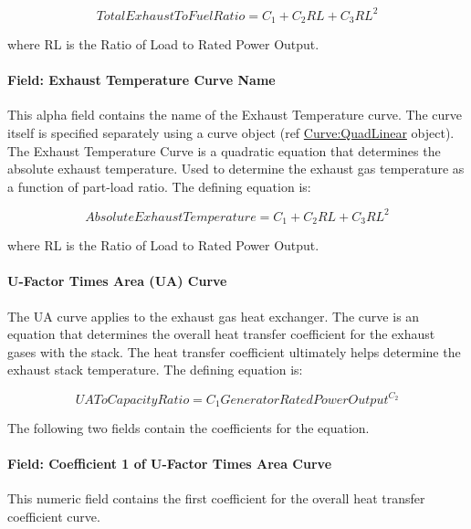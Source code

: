 \begin{equation}
TotalExhaustToFuelRatio = {C_1} + {C_2}RL + {C_3}R{L^2}
\end{equation}

where RL is the Ratio of Load to Rated Power Output.

\paragraph{Field: Exhaust Temperature Curve Name}\label{field-exhaust-temperature-curve-name}

This alpha field contains the name of the Exhaust Temperature curve. The curve itself is specified separately using a curve object (ref \hyperref[curvequadlinear]{Curve:QuadLinear} object). The Exhaust Temperature Curve is a quadratic equation that determines the absolute exhaust temperature. Used to determine the exhaust gas temperature as a function of part-load ratio. The defining equation is:

\begin{equation}
AbsoluteExhaustTemperature = {C_1} + {C_2}RL + {C_3}R{L^2}
\end{equation}

where RL is the Ratio of Load to Rated Power Output.

\paragraph{U-Factor Times Area (UA) Curve}\label{u-factor-times-area-ua-curve}

The UA curve applies to the exhaust gas heat exchanger. The curve is an equation that determines the overall heat transfer coefficient for the exhaust gases with the stack. The heat transfer coefficient ultimately helps determine the exhaust stack temperature. The defining equation is:

\begin{equation}
UAToCapacityRatio = {C_1}GeneratorRatedPowerOutpu{t^{{C_2}}}
\end{equation}

The following two fields contain the coefficients for the equation.

\paragraph{Field: Coefficient 1 of U-Factor Times Area Curve}\label{field-coefficient-1-of-u-factor-times-area-curve}

This numeric field contains the first coefficient for the overall heat transfer coefficient curve.

